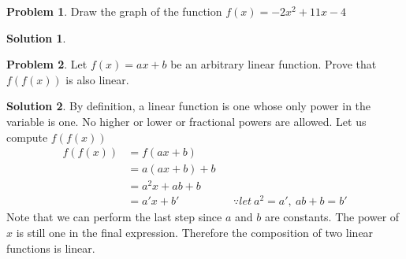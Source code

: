 \documentclass[a4paper]{article}
\theoremstyle{definition}
\newtheorem{problem}{Problem}[section]
\newtheorem*{solution}{Solution}
\begin{document}
\begin{problem}
Draw the graph of the function \(f(x) = -2x^2 + 11x - 4\)
\end{problem}

\begin{solution}
\end{solution}

\begin{problem}
Let \(f(x) = ax+b\) be an arbitrary linear function. Prove that \(f(f(x))\) is also linear.
\end{problem}
\begin{solution}
By definition, a linear function is one whose only power in the variable is one. No higher or lower or fractional powers are allowed. Let us compute \(f(f(x))\)
\begin{align*}
f(f(x)) &= f(ax+b) \\
    &=a(ax+b) + b\\
    &=a^2x + ab + b \\
    &=a'x + b' &&\because let\ a^2 = a', \ ab+b =b'
\end{align*}
Note that we can perform the last step since \(a\) and \(b\) are constants.
The power of \(x\) is still one in the final expression. Therefore the composition of two linear functions is linear. 
\end{solution}
\end{document}
